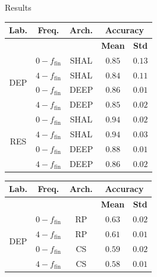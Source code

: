 \documentclass{beamer}
\begin{document}

\begin{frame}{Results}
\begin{table}[t]
\centering
\scriptsize
  \parbox{0.495\linewidth}{
\centering
\begin{tabular}{|c|c|c|c|c|}
\hline
\textbf{Lab.} & \textbf{Freq.} & \textbf{Arch.} & \multicolumn{2}{c}{\textbf{Accuracy}} \vline \\ \hline
& & & \textbf{Mean} & \textbf{Std} \\ \hline
\multirow{4}{*}{DEP} & $0-f_{\text{fin}}$ & SHAL &  $0.85$ & $0.13$    \\ \cline{2-5}
                     & $4-f_{\text{fin}}$ & SHAL &     $0.84$ & $0.11$    \\ \cline{2-5} 
                     & $0-f_{\text{fin}}$ & DEEP &     $\mathbf{0.86}$ & $0.01$    \\ \cline{2-5} 
                     & $4-f_{\text{fin}}$ & DEEP &     $0.85$ & $0.02$    \\ \hline
\multirow{4}{*}{RES} & $0-f_{\text{fin}}$ & SHAL &  $\mathbf{0.94}$ & $0.02$    \\ \cline{2-5} 
                     & $4-f_{\text{fin}}$ & SHAL &     $0.94$ & $0.03$    \\ \cline{2-5} 
                     & $0-f_{\text{fin}}$ & DEEP &     $0.88$ & $0.01$    \\ \cline{2-5} 
                     & $4-f_{\text{fin}}$ & DEEP &     $0.86$ & $0.02$    \\ \hline
\end{tabular}
}
\hfill
  \parbox{0.495\linewidth}{
\centering
\begin{tabular}{|c|c|c|c|c|}
\hline
\textbf{Lab.} & \textbf{Freq.} & \textbf{Arch.} & \multicolumn{2}{c}{\textbf{Accuracy}} \vline \\ \hline
& & & \textbf{Mean} & \textbf{Std} \\ \hline
\multirow{4}{*}{DEP} & $0-f_{\text{fin}}$ & RP &   $\mathbf{0.63}$ & $0.02$ \\ \cline{2-5}      
                     & $4-f_{\text{fin}}$ & RP &      $0.61$ & $0.01$   \\ \cline{2-5}             
                     & $0-f_{\text{fin}}$ & CS &      $0.59$ & $0.02$  \\ \cline{2-5}              
                     & $4-f_{\text{fin}}$ & CS &      $0.58$ & $0.01$ \\ \hline

\end{tabular}}
\end{table}
\end{frame}
\end{document}
